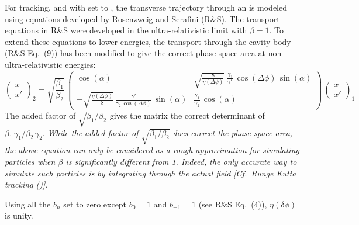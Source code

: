 For  tracking, and with  set to , the transverse
trajectory through an  is modeled using equations developed by Rosenzweig and
Serafini\cite{b:rosenzweig} (R\&S).
The transport equations in R\&S were developed in the ultra-relativistic limit with $\beta = 1$.  To
extend these equations to lower energies, the transport through the cavity body (R\&S Eq.~(9)) has
been modified to give the correct phase-space area at non ultra-relativistic energies:
\begin{equation}
  \begin{pmatrix}
    x \\ 
    x'
  \end{pmatrix}_2 = \sqrt{\frac{\beta_1}{\beta_2}} \, 
  \begin{pmatrix}
    \cos(\alpha)  &
        \sqrt{\frac{8}{\eta(\Delta\phi)}} \, \frac{\, \gamma_1}{\gamma'} \, \cos(\Delta\phi) \, \sin(\alpha) \\
    -\sqrt{\frac{\eta(\Delta\phi)}{8}} \, \frac{\gamma'}{\gamma_2 \, \cos(\Delta\phi)} \, \sin(\alpha) &
        \frac{\gamma_1}{\gamma_2} \, \cos(\alpha)
  \end{pmatrix}
  \,
  \begin{pmatrix}
    x \\ 
    x'
  \end{pmatrix}_1
  \label{xxpc}
\end{equation}
The added factor of $\sqrt{\beta_1/\beta_2}$ gives the matrix the correct determinant of $\beta_1 \,
\gamma_1 / \beta_2 \, \gamma_2$. {\em While the added factor of $\sqrt{\beta_1/\beta_2}$ does
correct the phase space area, the above equation can only be considered as a rough approximation for
simulating particles when $\beta$ is significantly different from 1. Indeed, the only accurate way
to simulate such particles is by integrating through the actual field [Cf.~Runge Kutta tracking
()]}.

Using all the $b_n$ set to zero except $b_0 = 1$ and $b_{-1} = 1$ (see R\&S Eq.~(4)),
$\eta(\delta\phi)$ is unity.

